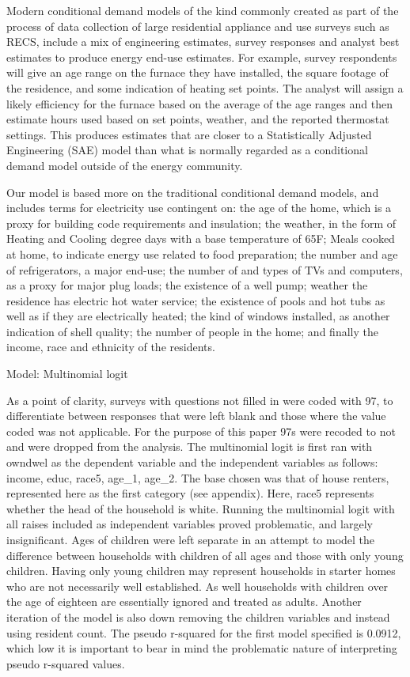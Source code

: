 \documentclass{article}
\begin{document}
  
  
Modern conditional demand models of the kind commonly created as part of the process of data collection of large residential appliance and use surveys such as RECS, include a mix of engineering estimates, survey responses and analyst best estimates to produce energy end-use estimates.  For example, survey respondents will give an age range on the furnace they have installed, the square footage of the residence, and some indication of heating set points.  The analyst will assign a likely efficiency for the furnace based on the average of the age ranges and then estimate hours used based on set points, weather, and the reported thermostat settings.  This produces estimates that are closer to a Statistically Adjusted Engineering (SAE) model than what is normally regarded as a conditional demand model outside of the energy community.

Our model is based more on the traditional conditional demand models, and includes terms for electricity use contingent on: the age of the home, which is a proxy for building code requirements and insulation; the weather, in the form of Heating and Cooling degree days with a base temperature of 65F; Meals cooked at home, to indicate energy use related to food preparation; the number and age of refrigerators, a major end-use;  the number of and types of TVs and computers, as a proxy for major plug loads; the existence of a well pump; weather the residence has electric hot water service; the existence of pools and hot tubs as well as if they are electrically heated; the kind of windows installed, as another indication of shell quality; the number of people in the home; and finally the income, race and ethnicity of the residents.  


Model: Multinomial logit

As a point of clarity, surveys with questions not filled in were coded with 97, to differentiate between responses that were left blank and those where the value coded was not applicable.  For the purpose of this paper 97s were recoded to not and were dropped from the analysis.  
The multinomial logit is first ran with owndwel as the dependent variable and the independent variables as follows: income, educ, race5, age_1, age_2.  The base chosen was that of house renters, represented here as the first category (see appendix).  Here, race5 represents whether the head of the household is white.  Running the multinomial logit with all raises included as independent variables proved problematic, and largely insignificant.  Ages of children were left separate in an attempt to model the difference between households with children of all ages and those with only young children.  Having only young children may represent households in starter homes who are not necessarily well established.  As well households with children over the age of eighteen are essentially ignored and treated as adults.  Another iteration of the model is also down removing the children variables and instead using resident count.
The pseudo r-squared for the first model specified is 0.0912, which low it is important to bear in mind the problematic nature of interpreting pseudo r-squared values.  
\end{document}
